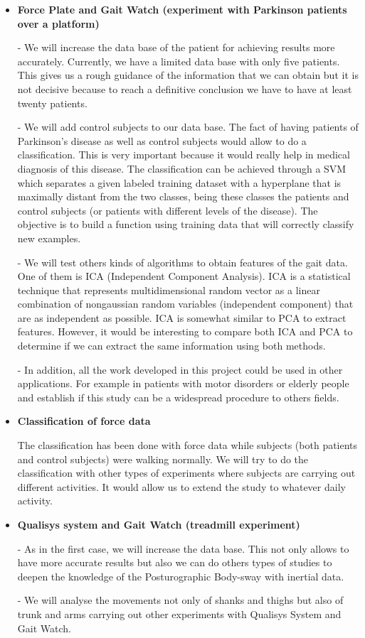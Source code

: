 \begin{itemize}
\item \textbf{Force Plate and Gait Watch (experiment with Parkinson patients over a platform)}

- We will increase the data base of the patient for achieving results more accurately. Currently, we have a limited data base with only five patients. This gives us a rough guidance of the information that we can obtain but it is not decisive because to reach a definitive conclusion we have to have at least twenty patients.

-	We will add control subjects to our data base. The fact of having patients of Parkinson’s disease as well as control subjects would allow to do a classification. This is very important because it would really help in medical diagnosis of this disease.
The classification can be achieved through a SVM which separates a given labeled training dataset with a hyperplane that is maximally distant from the two classes, being these classes the patients and control subjects (or patients with different levels of the disease). The objective is to build a function using training data that will correctly classify new examples.

- We will test others kinds of algorithms to obtain features of the gait data. One of them is ICA (Independent Component Analysis).  ICA is a statistical technique that represents multidimensional random vector as a linear combination of nongaussian random variables (independent component) that are as independent as possible. ICA is somewhat similar to PCA to extract features. However, it would be interesting to compare both ICA and PCA to determine if we can extract the same information using both methods. 

- In addition, all the work developed in this project could be used in other applications. For example in patients with motor disorders or elderly people and establish if this study can be a widespread procedure to others fields.

\item \textbf{Classification of force data}

The classification has been done with force data while subjects (both patients and control subjects) were walking normally. We will try to do the classification with other types of experiments where subjects are carrying out different activities. It would allow us to extend the study to whatever daily activity.

\item \textbf{Qualisys system and Gait Watch (treadmill experiment)}

-	As in the first case, we will increase the data base. This not only allows to have more accurate results but also we can do others types of studies to deepen the knowledge of the Posturographic Body-sway  with inertial data.

-	We will analyse the movements not only of shanks and thighs but also of trunk and arms carrying out other experiments with Qualisys System and Gait Watch.
	
\end{itemize}